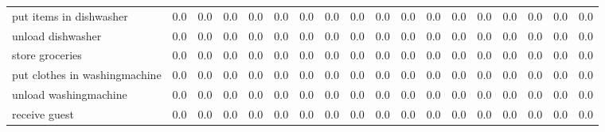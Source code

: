 \documentclass{article}
\begin{document}
\begin{sideways}
\begin{tabular}{lrrrrrrrrrrrrrrrrr}
put items in dishwasher       &         0.0 &                0.0 &           0.0 &               0.0 &                0.0 &                0.0 &              0.0 &                      0.0 &                   0.0 &              0.0 &              0.0 &                            0.0 &                      0.0 &                    0.0 &                                  0.0 &                          0.0 &                  0.0 \\
unload dishwasher             &         0.0 &                0.0 &           0.0 &               0.0 &                0.0 &                0.0 &              0.0 &                      0.0 &                   0.0 &              0.0 &              0.0 &                            0.0 &                      0.0 &                    0.0 &                                  0.0 &                          0.0 &                  0.0 \\
store groceries               &         0.0 &                0.0 &           0.0 &               0.0 &                0.0 &                0.0 &              0.0 &                      0.0 &                   0.0 &              0.0 &              0.0 &                            0.0 &                      0.0 &                    0.0 &                                  0.0 &                          0.0 &                  0.0 \\
put clothes in washingmachine &         0.0 &                0.0 &           0.0 &               0.0 &                0.0 &                0.0 &              0.0 &                      0.0 &                   0.0 &              0.0 &              0.0 &                            0.0 &                      0.0 &                    0.0 &                                  0.0 &                          0.0 &                  0.0 \\
unload washingmachine         &         0.0 &                0.0 &           0.0 &               0.0 &                0.0 &                0.0 &              0.0 &                      0.0 &                   0.0 &              0.0 &              0.0 &                            0.0 &                      0.0 &                    0.0 &                                  0.0 &                          0.0 &                  0.0 \\
receive guest                 &         0.0 &                0.0 &           0.0 &               0.0 &                0.0 &                0.0 &              0.0 &                      0.0 &                   0.0 &              0.0 &              0.0 &                            0.0 &                      0.0 &                    0.0 &                                  0.0 &                          0.0 &                  0.0 \\
\bottomrule
\end{tabular}
\end{sideways}
\end{document}
